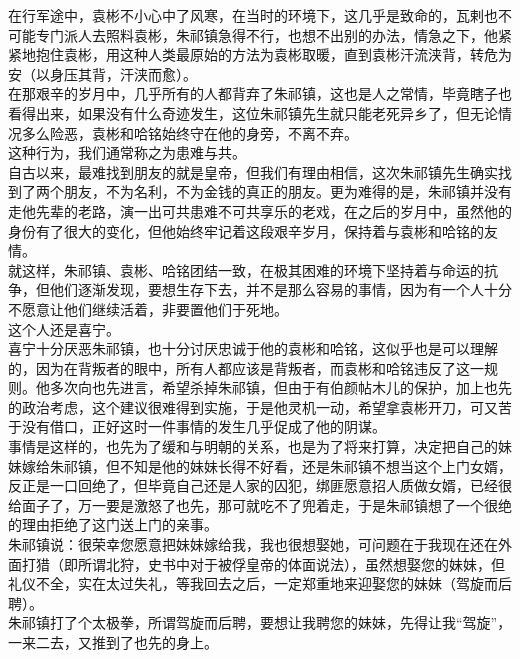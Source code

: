 \begin{multicols}{\theparacolNo}
在行军途中，袁彬不小心中了风寒，在当时的环境下，这几乎是致命的，瓦剌也不可能专门派人去照料袁彬，朱祁镇急得不行，也想不出别的办法，情急之下，他紧紧地抱住袁彬，用这种人类最原始的方法为袁彬取暖，直到袁彬汗流浃背，转危为安（以身压其背，汗浃而愈）。\\

在那艰辛的岁月中，几乎所有的人都背弃了朱祁镇，这也是人之常情，毕竟瞎子也看得出来，如果没有什么奇迹发生，这位朱祁镇先生就只能老死异乡了，但无论情况多么险恶，袁彬和哈铭始终守在他的身旁，不离不弃。\\

这种行为，我们通常称之为患难与共。\\

自古以来，最难找到朋友的就是皇帝，但我们有理由相信，这次朱祁镇先生确实找到了两个朋友，不为名利，不为金钱的真正的朋友。更为难得的是，朱祁镇并没有走他先辈的老路，演一出可共患难不可共享乐的老戏，在之后的岁月中，虽然他的身份有了很大的变化，但他始终牢记着这段艰辛岁月，保持着与袁彬和哈铭的友情。\\

就这样，朱祁镇、袁彬、哈铭团结一致，在极其困难的环境下坚持着与命运的抗争，但他们逐渐发现，要想生存下去，并不是那么容易的事情，因为有一个人十分不愿意让他们继续活着，非要置他们于死地。\\

这个人还是喜宁。\\

喜宁十分厌恶朱祁镇，也十分讨厌忠诚于他的袁彬和哈铭，这似乎也是可以理解的，因为在背叛者的眼中，所有人都应该是背叛者，而袁彬和哈铭违反了这一规则。他多次向也先进言，希望杀掉朱祁镇，但由于有伯颜帖木儿的保护，加上也先的政治考虑，这个建议很难得到实施，于是他灵机一动，希望拿袁彬开刀，可又苦于没有借口，正好这时一件事情的发生几乎促成了他的阴谋。\\

事情是这样的，也先为了缓和与明朝的关系，也是为了将来打算，决定把自己的妹妹嫁给朱祁镇，但不知是他的妹妹长得不好看，还是朱祁镇不想当这个上门女婿，反正是一口回绝了，但毕竟自己还是人家的囚犯，绑匪愿意招人质做女婿，已经很给面子了，万一要是激怒了也先，那可就吃不了兜着走，于是朱祁镇想了一个很绝的理由拒绝了这门送上门的亲事。\\

朱祁镇说：很荣幸您愿意把妹妹嫁给我，我也很想娶她，可问题在于我现在还在外面打猎（即所谓北狩，史书中对于被俘皇帝的体面说法），虽然想娶您的妹妹，但礼仪不全，实在太过失礼，等我回去之后，一定郑重地来迎娶您的妹妹（驾旋而后聘）。\\

朱祁镇打了个太极拳，所谓驾旋而后聘，要想让我聘您的妹妹，先得让我“驾旋”，一来二去，又推到了也先的身上。\\


\end{multicols}
